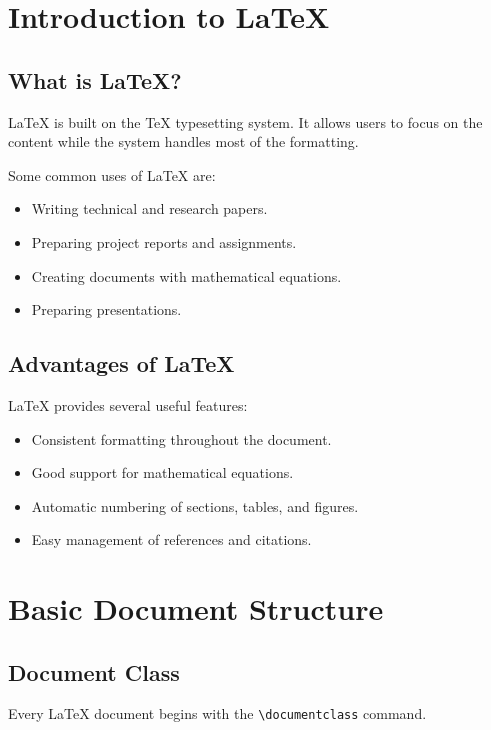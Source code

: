 \documentclass[12pt,a4paper]{report}
\begin{document}
	\chapter{Introduction to LaTeX}
	
	\section{What is LaTeX?}
	
	LaTeX is built on the TeX typesetting system. It allows
	users to focus on the content while the system handles
	most of the formatting.
	
	Some common uses of LaTeX are:
	
	\begin{itemize}
		\item Writing technical and research papers.
		\item Preparing project reports and assignments.
		\item Creating documents with mathematical equations.
		\item Preparing presentations.
	\end{itemize}
	
	\section{Advantages of LaTeX}
	
	LaTeX provides several useful features:
	
	\begin{itemize}
		\item Consistent formatting throughout the document.
		\item Good support for mathematical equations.
		\item Automatic numbering of sections, tables, and figures.
		\item Easy management of references and citations.
	\end{itemize}
	
	\chapter{Basic Document Structure}
	
	\section{Document Class}
	
	Every LaTeX document begins with the
	\texttt{\textbackslash documentclass} command.
	
\end{document}
